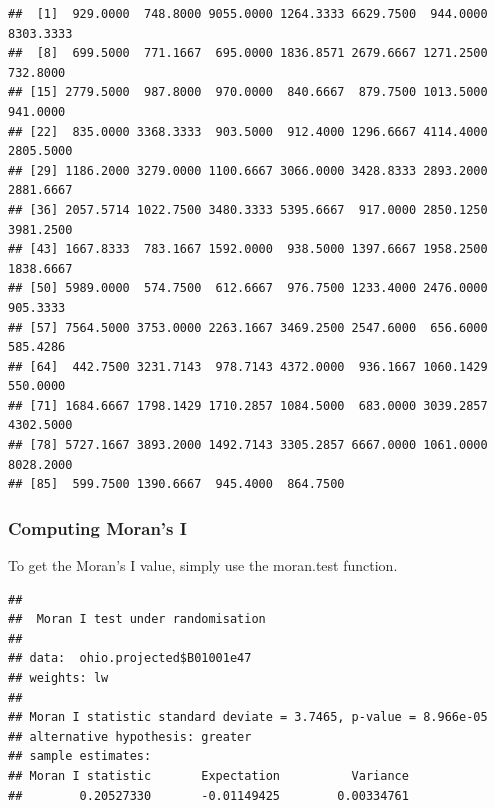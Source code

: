\documentclass[]{article}
\newenvironment{Shaded}{\begin{snugshade}}{\end{snugshade}}
\newcommand{\FunctionTok}[1]{\textcolor[rgb]{0.13,0.29,0.53}{\textbf{#1}}}
\newcommand{\NormalTok}[1]{#1}
\newcommand{\OtherTok}[1]{\textcolor[rgb]{0.56,0.35,0.01}{#1}}
\newcommand{\SpecialCharTok}[1]{\textcolor[rgb]{0.81,0.36,0.00}{\textbf{#1}}}
\begin{document}
\begin{Shaded}
\end{Shaded}

\begin{verbatim}
##  [1]  929.0000  748.8000 9055.0000 1264.3333 6629.7500  944.0000 8303.3333
##  [8]  699.5000  771.1667  695.0000 1836.8571 2679.6667 1271.2500  732.8000
## [15] 2779.5000  987.8000  970.0000  840.6667  879.7500 1013.5000  941.0000
## [22]  835.0000 3368.3333  903.5000  912.4000 1296.6667 4114.4000 2805.5000
## [29] 1186.2000 3279.0000 1100.6667 3066.0000 3428.8333 2893.2000 2881.6667
## [36] 2057.5714 1022.7500 3480.3333 5395.6667  917.0000 2850.1250 3981.2500
## [43] 1667.8333  783.1667 1592.0000  938.5000 1397.6667 1958.2500 1838.6667
## [50] 5989.0000  574.7500  612.6667  976.7500 1233.4000 2476.0000  905.3333
## [57] 7564.5000 3753.0000 2263.1667 3469.2500 2547.6000  656.6000  585.4286
## [64]  442.7500 3231.7143  978.7143 4372.0000  936.1667 1060.1429  550.0000
## [71] 1684.6667 1798.1429 1710.2857 1084.5000  683.0000 3039.2857 4302.5000
## [78] 5727.1667 3893.2000 1492.7143 3305.2857 6667.0000 1061.0000 8028.2000
## [85]  599.7500 1390.6667  945.4000  864.7500
\end{verbatim}

\subsubsection{Computing Moran's I}\label{computing-morans-i}

To get the Moran's I value, simply use the moran.test function.

\begin{Shaded}
\end{Shaded}

\begin{verbatim}
## 
##  Moran I test under randomisation
## 
## data:  ohio.projected$B01001e47  
## weights: lw    
## 
## Moran I statistic standard deviate = 3.7465, p-value = 8.966e-05
## alternative hypothesis: greater
## sample estimates:
## Moran I statistic       Expectation          Variance 
##        0.20527330       -0.01149425        0.00334761
\end{verbatim}
\end{document}
